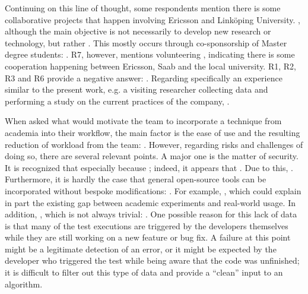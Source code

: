 Continuing on this line of thought, some respondents mention there is some collaborative projects that happen involving Ericsson and Link\"oping University.
, although the main objective is not necessarily to develop new research or technology, but rather .
This mostly occurs through co-sponsorship of Master degree students: .
R7, however, mentions volunteering , indicating there is some cooperation happening between Ericsson, Saab and the local university.
R1, R2, R3 and R6 provide a negative answer: .
Regarding specifically an experience similar to the present work, e.g. a visiting researcher collecting data and performing a study on the current practices of the company, .

When asked what would motivate the team to incorporate a technique from academia into their workflow, the main factor is the ease of use and the resulting reduction of workload from the team: .
However, regarding risks and challenges of doing so, there are several relevant points.
A major one is the matter of security.
It is recognized that  especially because ; indeed, it appears that .
Due to this, .
Furthermore, it is hardly the case that general open-source tools can be incorporated without bespoke modifications: .
For example, , which could explain in part the existing gap between academic experiments and real-world usage.
In addition, , which is not always trivial: .
One possible reason for this lack of data is that many of the test executions are triggered by the developers themselves while they are still working on a new feature or bug fix. 
A failure at this point might be a legitimate detection of an error, or it might be expected by the developer who triggered the test while being aware that the code was unfinished; it is difficult to filter out this type of data and provide a ``clean'' input to an algorithm.

